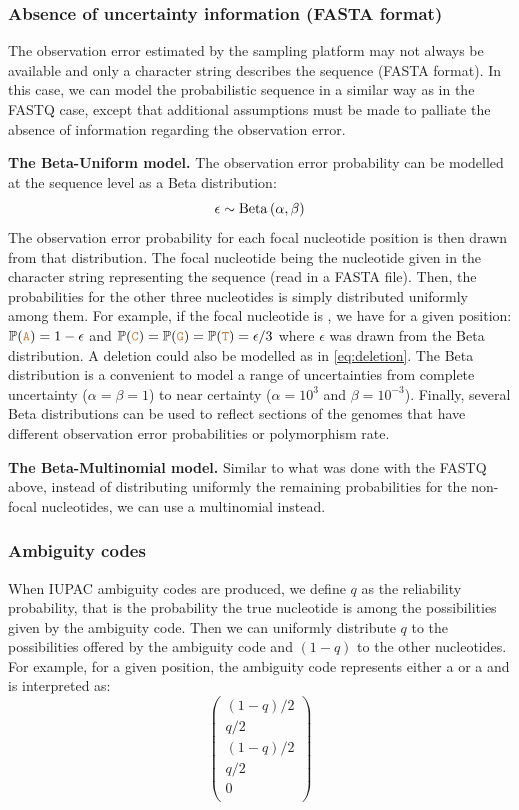 \documentclass[10pt]{article}
\begin{document}
\subsubsection{Absence of uncertainty information (FASTA format)}

The observation error estimated by the sampling platform may not always be available and only a character string describes the sequence (FASTA format). 
In this case, we can model the probabilistic sequence in a similar way as in the FASTQ case, except that additional assumptions must be made to palliate the absence of information regarding the observation error.

\textbf{The Beta-Uniform model.}
The observation error probability can be modelled at the sequence level as a Beta distribution:
\begin{equation}
\epsilon \sim  \mathrm{Beta}\left(\alpha, \beta\right)
\end{equation}
The observation error probability for each focal nucleotide position is then drawn from that distribution. The focal nucleotide being the nucleotide given in the character string representing the sequence (\ie read in a FASTA file). Then, the probabilities for the other three nucleotides is simply distributed uniformly among them.
For example, if the focal nucleotide is , we have for a given position: $\mathbb{P}(\texttt{\textcolor{brown}{A}}) = 1-\epsilon$ and $\mathbb{P}(\texttt{\textcolor{brown}{C}})=\mathbb{P}(\texttt{\textcolor{brown}{G}})=\mathbb{P}(\texttt{\textcolor{brown}{T}}) = \epsilon / 3$ where $\epsilon$ was drawn from the Beta distribution.
A deletion could also be modelled as in \autoref{eq:deletion}.
The Beta distribution is a convenient to model a range of uncertainties from complete uncertainty ($\alpha=\beta=1$) to near certainty (\eg $\alpha=10^3$ and $\beta=10^{-3}$).
Finally, several Beta distributions can be used to reflect sections of the genomes that have different observation error probabilities or polymorphism rate.

\textbf{The Beta-Multinomial model.}
Similar to what was done with the FASTQ above, instead of distributing uniformly the remaining probabilities for the non-focal nucleotides, we can use a multinomial instead. 


\subsubsection{Ambiguity codes}

When IUPAC ambiguity codes are produced, we define $q$ as the reliability probability, that is the probability the true nucleotide is among the possibilities given by the ambiguity code. Then we can uniformly distribute $q$ to the possibilities offered by the ambiguity code and $(1-q)$ to the other nucleotides.
For example, for a given position, the ambiguity code  represents either a  or a  and is interpreted as:
\begin{equation}
\begin{pmatrix}
(1-q)/2  \\
q/2  \\
(1-q)/2 \\
q/2 \\
0\\
\end{pmatrix}
\label{eq:ambiguity}
\end{equation}
\end{document}
